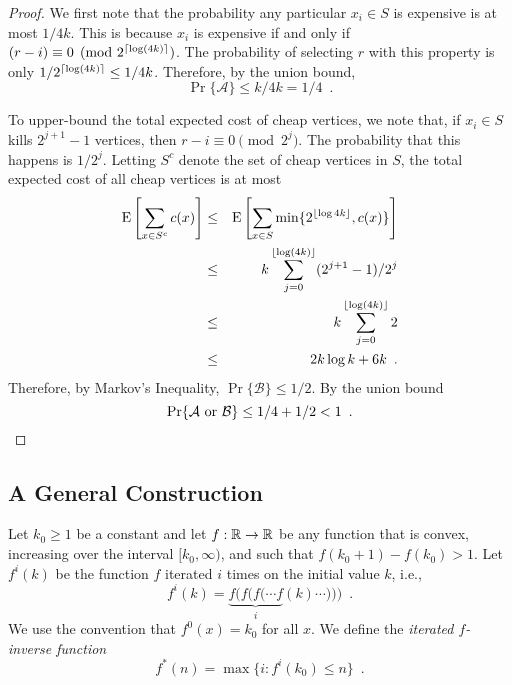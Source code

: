 \documentclass{cccg12}
\begin{document}
\begin{proof}
  We first note that the probability any particular $x_i\in S$ is
  expensive is at most $1/4k$.  This is because $x_i$ is expensive if and
  only if $(r-i)\equiv 0 \pmod {2^{{\lceil \log(4k) \rceil}}}$.  The probability
  of selecting $r$ with this property is only $1/2^{{\lceil \log(4k) \rceil}}
  \le 1/4k$. Therefore, by the union bound,
  \[
     \Pr\{\mathcal{A}\} \le k/4k = 1/4 \enspace .
  \]

  To upper-bound the total expected cost of cheap vertices, we note that,
  if $x_i\in S$ kills $2^{j+1}-1$ vertices, then $r-i\equiv 0\pmod{2^j}$.
  The probability that this happens is $1/2^{j}$. 
  Letting $S^{c}$
  denote the set of cheap vertices in $S$, the total expected cost of
  all cheap vertices is at most
  \begin{eqnarray*}
     \mathrm{E}\left[\sum_{x\in S^{c}}c(x) \right] 
     &\le& \mathrm{E}\left[\sum_{x\in S}\min\{2^{{\lfloor \log 4k \rfloor}},c(x)\} \right]  \\
    &\le&  k\sum_{j=0}^{{\lfloor \log (4k) \rfloor}} (2^{j+1}-1)/2^j \\
     &\le& k\sum_{j=0}^{{\lfloor \log (4k) \rfloor}} 2 \\
     &\le & 2k\log k + 6k \enspace .
  \end{eqnarray*}
  Therefore, by Markov's Inequality, $\Pr\{\mathcal{B}\}\le 1/2$.
  By the union bound
  \[
     \Pr\{\mbox{$\mathcal{A}$ or $\mathcal{B}$}\} \le 1/4+ 1/2 < 1
  \enspace . \qedhere
  \]
\end{proof}

\subsection{A General Construction}

Let $k_0\ge 1$ be a constant and let $f:\mathbb{R}\rightarrow\mathbb{R}$ be any function
that is convex, increasing over the interval $[k_0,\infty)$, and such that
$f(k_0+1)-f(k_0) > 1$.  Let $f^{i}(k)$ be the function $f$ iterated $i$
times on the initial value $k$, i.e.,
\[
   f^{i}(k) = \underbrace{f(f(f(\cdots f}_{i}(k)\cdots))) \enspace .
\]
We use the convention that $f^0(x) = k_0$ for all $x$.  We define the
\emph{iterated $f$-inverse function}
\[
   f^*(n) = \max\{i : f^{i}(k_0) \le n\} \enspace .
\] 
\end{document}
